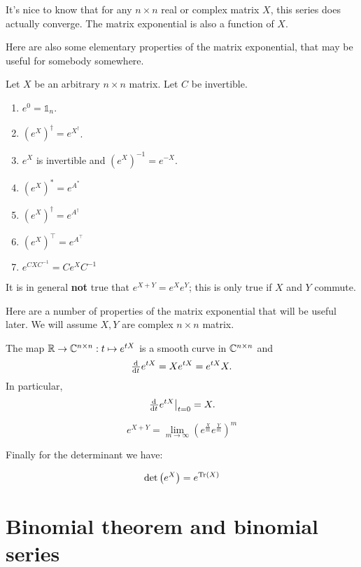 It's nice to know that for any $n \times n$ real or complex matrix $X$, this series does actually converge. The matrix exponential is also a  function of $X$.

Here are also some elementary properties of the matrix exponential, that may be useful for somebody somewhere.
\begin{eigenschap}
Let $X$ be an arbitrary $n\times n$ matrix. Let $C$ be invertible.
\begin{enumerate}
\item $e^0 = \mathbb{1}_n$.
\item $\left(e^X\right)^\dagger = e^{X^\dagger}$.
\item $e^X$ is invertible and $\left(e^X\right)^{-1} = e^{-X}$.
\item $\left(e^X\right)^* = e^{A^*}$
\item $\left(e^X\right)^\dagger = e^{A^\dagger}$
\item $\left(e^X\right)^\intercal = e^{A^\intercal}$
\item $e^{CXC^{-1}} = Ce^XC^{-1}$
\end{enumerate}
\end{eigenschap}
It is in general \textbf{not} true that $e^{X+Y} = e^Xe^Y$; this is only true if $X$ and $Y$ commute.

Here are a number of properties of the matrix exponential that will be useful later. We will assume $X, Y$ are complex $n\times n$ matrix.
\begin{eigenschap}
The map $\mathbb{R} \to \mathbb{C}^{n\times n}: t \mapsto e^{tX}$ is a smooth curve in $\mathbb{C}^{n\times n}$ and
\[ \od{}{t}e^{tX} = Xe^{tX} = e^{tX}X. \]
In particular,
\[ \left.\od{}{t}e^{tX}\right|_{t=0} = X. \]
\end{eigenschap}

\begin{eigenschap}
\[ e^{X+Y} = \lim_{m\to\infty} \left(e^{\frac{X}{m}}e^{\frac{Y}{m}}\right)^m \]
\end{eigenschap}
Finally for the determinant we have:
\begin{eigenschap}
\[\det \left(e^X\right) = e^{\operatorname{Tr}(X)}\]
\end{eigenschap}

\section{Binomial theorem and binomial series}